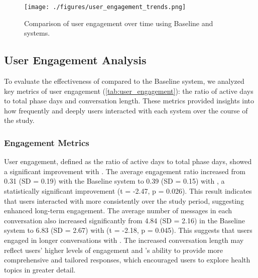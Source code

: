 \begin{table}[ht]
\centering
\caption{Comparison of user engagement metrics between Baseline and \name{} systems.}
\label{tab:user_engagement}
\renewcommand{\arraystretch}{1.2} %
\end{table}


\begin{figure}[ht]
\centering
\texttt{[image: ./figures/user\_engagement\_trends.png]}
\vspace{-5mm}
\caption{Comparison of user engagement over time using Baseline and \name{} systems.}
\label{fig:engagement_trends}
\end{figure}

\subsection{User Engagement Analysis}
To evaluate the effectiveness of \name{} compared to the Baseline system, we analyzed key metrics of user engagement (\autoref{tab:user_engagement}): the ratio of active days to total phase days and conversation length. These metrics provided insights into how frequently and deeply users interacted with each system over the course of the study.

\subsubsection{Engagement Metrics}
User engagement, defined as the ratio of active days to total phase days, showed a significant improvement with \name{}. The average engagement ratio increased from 0.31 (SD = 0.19) with the Baseline system to 0.39 (SD = 0.15) with \name{}, a statistically significant improvement (t = -2.47, p = 0.026). 
This result indicates that users interacted with \name{} more consistently over the study period, suggesting enhanced long-term engagement.
The average number of messages in each conversation also increased significantly from 4.84 (SD = 2.16) in the Baseline system to 6.83 (SD = 2.67) with \name{} (t = -2.18, p = 0.045). This suggests that users engaged in longer conversations with \name{}. 
The increased conversation length may reflect users’ higher levels of engagement and \name{}'s ability to provide more comprehensive and tailored responses, which encouraged users to explore health topics in greater detail.


